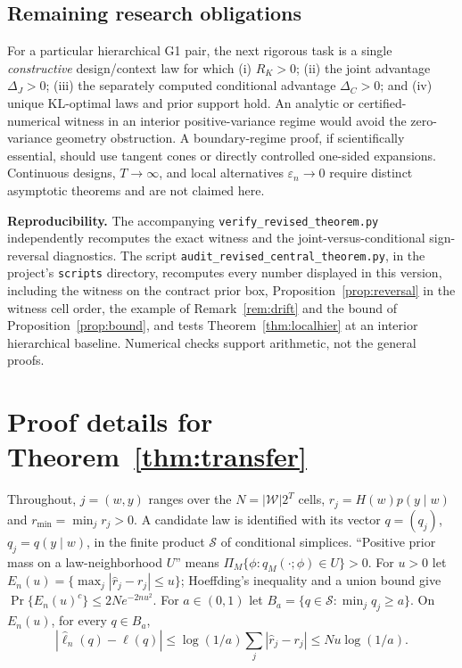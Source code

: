 \documentclass[11pt,letterpaper]{article}
\theoremstyle{plain}
\theoremstyle{definition}
\begin{document}
\subsection{Remaining research obligations}
For a particular hierarchical G1 pair, the next rigorous task is a single \emph{constructive} design/context law for which (i) $R_K>0$; (ii) the joint advantage $\Delta_J>0$; (iii) the separately computed conditional advantage $\Delta_C>0$; and (iv) unique KL-optimal laws and prior support hold. An analytic or certified-numerical witness in an interior positive-variance regime would avoid the zero-variance geometry obstruction. A boundary-regime proof, if scientifically essential, should use tangent cones or directly controlled one-sided expansions. Continuous designs, $T\to\infty$, and local alternatives $\varepsilon_n\to0$ require distinct asymptotic theorems and are not claimed here.

\vspace{6pt}\noindent\textbf{Reproducibility.} The accompanying \texttt{verify\_revised\_theorem.py} independently recomputes the exact witness and the joint-versus-conditional sign-reversal diagnostics. The script \nolinkurl{audit_revised_central_theorem.py}, in the project's \texttt{scripts} directory, recomputes every number displayed in this version, including the witness on the contract prior box, Proposition~\ref{prop:reversal} in the witness cell order, the example of Remark~\ref{rem:drift} and the bound of Proposition~\ref{prop:bound}, and tests Theorem~\ref{thm:localhier} at an interior hierarchical baseline. Numerical checks support arithmetic, not the general proofs.

\appendix
\section{Proof details for Theorem~\ref{thm:transfer}}\label{app:transfer}
Throughout, $j=(w,y)$ ranges over the $N=|\mathcal W|2^T$ cells, $r_j=H(w)p(y\mid w)$ and $r_{\min}=\min_jr_j>0$. A candidate law is identified with its vector $q=(q_j)$, $q_j=q(y\mid w)$, in the finite product $\mathcal S$ of conditional simplices. ``Positive prior mass on a law-neighborhood $U$'' means $\Pi_M\{\phi:q_M(\cdot;\phi)\in U\}>0$. For $u>0$ let $E_n(u)=\{\max_j|\hat r_j-r_j|\le u\}$; Hoeffding's inequality and a union bound give $\Pr\{E_n(u)^c\}\le2Ne^{-2nu^2}$. For $a\in(0,1)$ let $B_a=\{q\in\mathcal S:\min_jq_j\ge a\}$. On $E_n(u)$, for every $q\in B_a$,
\begin{equation}\label{eq:unifB}
|\hat\ell_n(q)-\ell(q)|\le\log(1/a)\sum_j|\hat r_j-r_j|\le Nu\log(1/a).
\end{equation}
\end{document}
